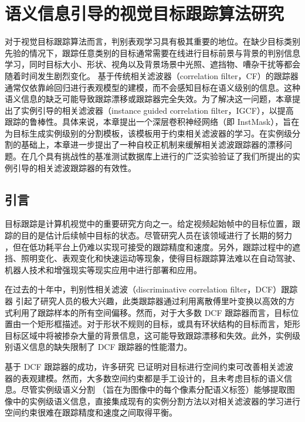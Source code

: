 \chapter{语义信息引导的视觉目标跟踪算法研究}\label{chap:IGCF}

对于视觉目标跟踪算法而言，判别表观学习具有极其重要的地位。在缺少目标类别先验的情况下，跟踪任意类别的目标通常需要在线进行目标前景与背景的判别信息学习，同时目标大小、形状、视角以及背景场景中光照、遮挡物、嘈杂干扰等都会随着时间发生剧烈变化。
基于传统相关滤波器（correlation filter，CF）的跟踪器通常仅依靠岭回归进行表观模型的建模，而不会感知目标在语义级别的信息。这种语义信息的缺乏可能导致跟踪漂移或跟踪器完全失效。为了解决这一问题，本章提出了实例引导的相关滤波器（instance guided correlation filter，IGCF），以提高跟踪的鲁棒性。具体来说，本章提出一个深层卷积神经网络（即 InstMask），旨在为目标生成实例级别的分割模板，该模板用于约束相关滤波器的学习。在实例级分割的基础上，本章进一步提出了一种自校正机制来缓解相关滤波跟踪器的漂移问题。在几个具有挑战性的基准测试数据库上进行的广泛实验验证了我们所提出的实例引导的相关滤波跟踪器的有效性。%

\section{引言}
目标跟踪是计算机视觉中的重要研究方向之一。给定视频起始帧中的目标位置，跟踪的目的是估计后续帧中目标的状态。尽管研究人员在该领域进行了长期的努力 \cite{Leang2018OnlineFO, Wang2019VisualOT, Zhang2018UsingFL}，但在低功耗平台上仍难以实现可接受的跟踪精度和速度。另外，跟踪过程中的遮挡、照明变化、表观变化和快速运动等现象，使得目标跟踪算法难以在自动驾驶、机器人技术和增强现实等现实应用中进行部署和应用。

在过去的十年中，判别性相关滤波（discriminative correlation filter，DCF）跟踪器 \cite{MOSSE,Henriques2012ExploitingTC,Danelljan2014AdaptiveCA} 引起了研究人员的极大兴趣，此类跟踪器通过利用离散傅里叶变换以高效的方式利用了跟踪样本的所有空间偏移。然而，对于大多数 DCF 跟踪器而言，目标位置由一个矩形框描述。对于形状不规则的目标，或具有环状结构的目标而言，矩形目标区域中将被掺杂大量的背景信息，这可能导致跟踪漂移和失效。此外，实例级别语义信息的缺失限制了 DCF 跟踪器的性能潜力。

基于 DCF 跟踪器的成功，许多研究 \cite{Danelljan2015LearningSR, Lukezic2017DiscriminativeCF} 已证明对目标进行空间约束可改善相关滤波器的表观建模。然而，大多数空间约束都是手工设计的，且未考虑目标的语义信息。尽管实例级语义分割 \cite{Pinheiro2015LearningTS, Zhang2019ProgressivelyDN}（旨在为图像中的每个像素分配语义标签）能够提取图像中的实例级语义信息，直接集成现有的实例分割方法以对相关滤波器的学习进行空间约束很难在跟踪精度和速度之间取得平衡。

